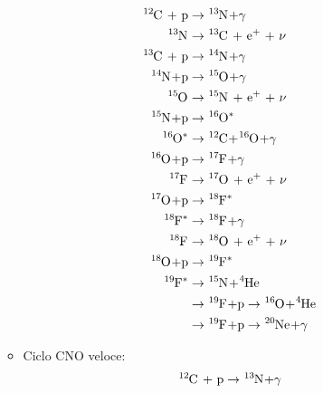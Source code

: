 \documentclass[a4paper,11pt]{article}
\theoremstyle{theorem}
\theoremstyle{definition}
\begin{document}
\begin{itemize}
\begin{itemize}
			\begin{align*}
			\tensor[^{12}]{\mathrm{C}}{}\textrm{ + p}&\rightarrow\tensor[^{13}]{\mathrm{N}}{}\mathrm{ + }\gamma\\
			\tensor[^{13}]{\mathrm{N}}{}&\rightarrow\tensor[^{13}]{\mathrm{C}}{}\textrm{ + e$^+$ + $\nu$}\\
			\tensor[^{13}]{\mathrm{C}}{}\textrm{ + p}&\rightarrow\tensor[^{14}]{\mathrm{N}}{}\mathrm{ + }\gamma\\
			\tensor[^{14}]{\mathrm{N}}{}\mathrm{ + p}&\rightarrow\tensor[^{15}]{\mathrm{O}}{}\mathrm{ + }\gamma\\
			\tensor[^{15}]{\mathrm{O}}{}&\rightarrow\tensor[^{15}]{\mathrm{N}}{}\textrm{ + e$^+$ + $\nu$}\\
			\tensor[^{15}]{\mathrm{N}}{}\mathrm{ + p}&\rightarrow\tensor[^{16}]{\mathrm{O}}{^*}\\
			\tensor[^{16}]{\mathrm{O}}{^*}&\rightarrow\tensor[^{12}]{\mathrm{C}}{}\mathrm{ + }\tensor[^{16}]{\mathrm{O}}{}\mathrm{ + }\gamma\\
			\tensor[^{16}]{\mathrm{O}}{}\mathrm{ + p}&\rightarrow\tensor[^{17}]{\mathrm{F}}{}\mathrm{ + }\gamma\\
			\tensor[^{17}]{\mathrm{F}}{}&\rightarrow\tensor[^{17}]{\mathrm{O}}{}\textrm{ + e$^+$ + $\nu$}\\
			\tensor[^{17}]{\mathrm{O}}{}\mathrm{ + p}&\rightarrow\tensor[^{18}]{\mathrm{F}}{^*}\\
			\tensor[^{18}]{\mathrm{F}}{^*}&\rightarrow\tensor[^{18}]{\mathrm{F}}{}\mathrm{ + }\gamma\\
			\tensor[^{18}]{\mathrm{F}}{}&\rightarrow\tensor[^{18}]{\mathrm{O}}{}\textrm{ + e$^+$ + $\nu$}\\
			\tensor[^{18}]{\mathrm{O}}{}\mathrm{ + p}&\rightarrow\tensor[^{19}]{\mathrm{F}}{^*}\\\tensor[^{19}]{\mathrm{F}}{^*}&\rightarrow\tensor[^{15}]{\mathrm{N}}{}\mathrm{ + }\tensor[^{4}]{\mathrm{He}}{}\\
			&\rightarrow\tensor[^{19}]{\mathrm{F}}{}\mathrm{ + p}\rightarrow\tensor[^{16}]{\mathrm{O}}{}\mathrm{ + }\tensor[^{4}]{\mathrm{He}}{}\\
			&\rightarrow\tensor[^{19}]{\mathrm{F}}{}\mathrm{ + p}\rightarrow\tensor[^{20}]{\mathrm{Ne}}{}\mathrm{ + }\gamma
			\end{align*}
			\item Ciclo CNO veloce:
			\begin{align*}
			\tensor[^{12}]{\mathrm{C}}{}\textrm{ + p}&\rightarrow\tensor[^{13}]{\mathrm{N}}{}\mathrm{ + }\gamma\\

\end{align*}
\end{itemize}
\end{itemize}
\end{document}
